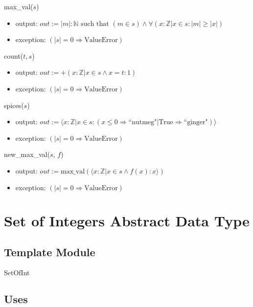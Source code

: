 \documentclass[12pt,fleqn]{examtst}
\begin{document}
\noindent max\_val($s$)
\begin{itemize}
\item output: $\mathit{out} := | m |: \mathbb{N} \text{ such that } (m \in s) \wedge
  \forall (x: \mathbb{Z} | x \in s : | m | \geq | x |)$
\item exception: $(|s| = 0 \Rightarrow \text{ValueError})$
\end{itemize}

\noindent count($t, s$)
\begin{itemize}
\item output: $\mathit{out} := + (x: \mathbb{Z} | x \in s \wedge x = t : 1)$
\item exception: $(|s| = 0 \Rightarrow \text{ValueError})$
\end{itemize}

\noindent spices($s$)
\begin{itemize}
\item output: $\mathit{out} := \langle x: \mathbb{Z} | x \in s : (x \leq 0
  \Rightarrow \text{``nutmeg"} | \text{True} \Rightarrow \text{``ginger"}) \rangle$
\item exception: $(|s| = 0 \Rightarrow \text{ValueError})$
\end{itemize}

\noindent new\_max\_val($s$, $f$)
\begin{itemize}
\item output: $\mathit{out} := \text{max\_val}(\langle x: \mathbb{Z} | x \in s
  \wedge f(x): x \rangle )$
\item exception: $(|s| = 0 \Rightarrow \text{ValueError})$
\end{itemize}


\newpage

\section* {Set of Integers Abstract Data Type}

\subsection* {Template Module}

SetOfInt

\subsection* {Uses}
\end{document}
